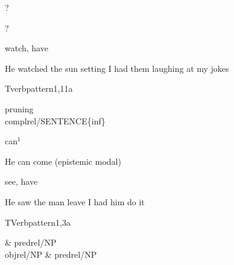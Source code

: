 
\begin{thetadescr}
\evitem ? 
\esitem
     \begin{examples}
        \example ?
     \end{examples}
\end{thetadescr}



\begin{thetadescr}
\evitem  watch, have
\esitem
     \begin{examples}
        \example He watched the sun setting
        \example I had them laughing at my jokes
     \end{examples}
\end{thetadescr}


\newpage
\verbpattern{[synCLOSEDINFSENT] }
\begin{vpattern}
 Tverbpattern1,11a
\csritem \mbox{}\\
     \begin{csr}
      pruning\\
      complrel/SENTENCE\{inf\}
     \end{csr}
\remarksitem
\end{vpattern}


\begin{thetadescr}
\evitem  can$^{1}$
\esitem
     \begin{examples}
        \example He can come (epistemic modal)
     \end{examples}
\end{thetadescr}



\begin{thetadescr}
\evitem  see, have
\esitem
     \begin{examples}
        \example He saw the man leave
        \example I had him do it
     \end{examples}
\end{thetadescr}


\newpage
\verbpattern{[synCLOSEDNPPROP] }
\begin{vpattern}
 TVerbpattern1,3a
\csritem \mbox{}\\
     \begin{csr}
                 & predrel/NP\\
       objrel/NP & predrel/NP
     \end{csr}
\remarksitem
\end{vpattern}

